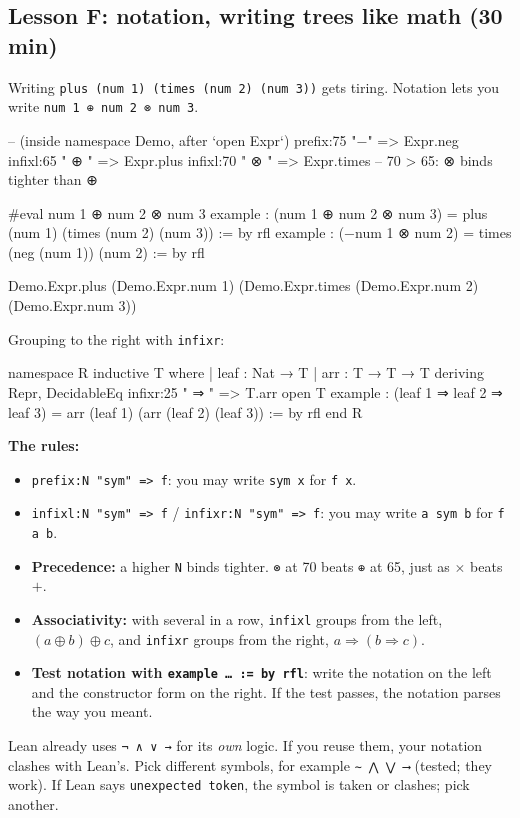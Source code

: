 \documentclass[11pt,a4paper]{article}
\newcommand{\code}[1]{\texttt{#1}}
\begin{document}
\subsection{Lesson F: notation, writing trees like math (30 min)}
Writing \code{plus (num 1) (times (num 2) (num 3))} gets tiring. Notation lets you write \code{num 1 ⊕ num 2 ⊗ num 3}.
\begin{lean}
-- (inside namespace Demo, after `open Expr`)
prefix:75 "−" => Expr.neg
infixl:65 " ⊕ " => Expr.plus
infixl:70 " ⊗ " => Expr.times      -- 70 > 65: ⊗ binds tighter than ⊕

#eval num 1 ⊕ num 2 ⊗ num 3
example : (num 1 ⊕ num 2 ⊗ num 3) = plus (num 1) (times (num 2) (num 3)) := by rfl
example : (−num 1 ⊗ num 2) = times (neg (num 1)) (num 2) := by rfl
\end{lean}
\begin{output}
Demo.Expr.plus (Demo.Expr.num 1) (Demo.Expr.times (Demo.Expr.num 2) (Demo.Expr.num 3))
\end{output}
Grouping to the right with \code{infixr}:
\begin{lean}
namespace R
inductive T where
  | leaf : Nat → T
  | arr  : T → T → T
  deriving Repr, DecidableEq
infixr:25 " ⇒ " => T.arr
open T
example : (leaf 1 ⇒ leaf 2 ⇒ leaf 3) = arr (leaf 1) (arr (leaf 2) (leaf 3)) := by rfl
end R
\end{lean}
\textbf{The rules:}
\begin{itemize}
\item \code{prefix:N "sym" => f}: you may write \code{sym x} for \code{f x}.
\item \code{infixl:N "sym" => f} / \code{infixr:N "sym" => f}: you may write \code{a sym b} for \code{f a b}.
\item \textbf{Precedence:} a higher \code{N} binds tighter. \code{⊗} at 70 beats \code{⊕} at 65, just as $\times$ beats $+$.
\item \textbf{Associativity:} with several in a row, \code{infixl} groups from the left, $(a\oplus b)\oplus c$, and \code{infixr} groups from the right, $a\Rightarrow(b\Rightarrow c)$.
\item \textbf{Test notation with \code{example … := by rfl}}: write the notation on the left and the constructor form on the right. If the test passes, the notation parses the way you meant.
\end{itemize}
\begin{warn}
Lean already uses \code{¬ ∧ ∨ →} for its \emph{own} logic. If you reuse them, your notation clashes with Lean's. Pick different symbols, for example \code{∼ ⋀ ⋁ ⟶} (tested; they work). If Lean says \code{unexpected token}, the symbol is taken or clashes; pick another.
\end{warn}
\end{document}
